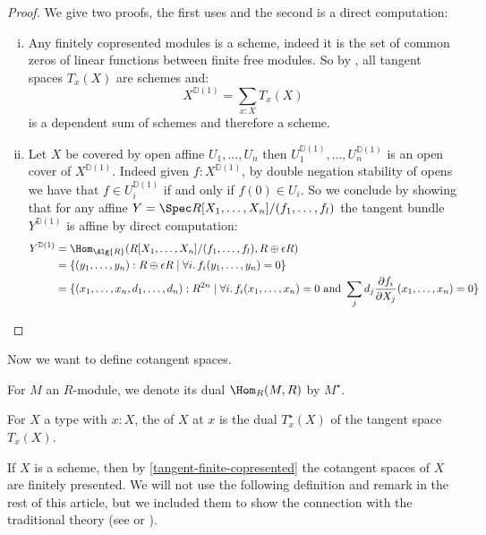 \begin{proof}
  We give two proofs, the first uses  and the second is a direct computation:
  \begin{enumerate}[(i)]
  \item Any finitely copresented modules is a scheme, indeed it is the set of common zeros of linear functions between finite free modules.
    So by , all tangent spaces $T_x(X)$ are schemes and:
    \[
      X^{\mathbb{D}(1)}=\sum_{x:X}T_x(X)
    \]
    is a dependent sum of schemes and therefore a scheme.
  \item Let $X$ be covered by open affine $U_1,\dots,U_n$ then $U_1^{\mathbb{D}(1)},\dots,U_n^{\mathbb{D}(1)}$ is an open cover of $X^{\mathbb{D}(1)}$. Indeed given $f:X^{\mathbb{D}(1)}$, by double negation stability of opens we have that $f\in U_i^{\mathbb{D}(1)}$ if and only if $f(0)\in U_i$.
    So we conclude by showing that for any affine $Y=\Spec R[X_1,\dots,X_n]/(f_1,\dots,f_l)$ the tangent bundle $Y^{\mathbb{D}(1)}$ is affine
    by direct computation:
    \begin{align*}
      Y^{\mathbb{D}(1)}&=\Hom_{\Alg{R}}(R[X_1,\dots,X_n]/(f_1,\dots,f_l), R\oplus \epsilon R) \\
                       &= \{(y_1,\dots,y_n):R\oplus \epsilon R \mid \forall i.\, f_i(y_1,\dots,y_n)=0\} \\
                       &= \{(x_1,\dots,x_n,d_1,\dots,d_n):R^{2n} \mid \forall i.\, f_i(x_1,\dots,x_n)=0\text{ and } \sum_j d_j\frac{\partial f_i}{\partial X_j}(x_1,\dots,x_n) =0\} 
    \end{align*}
  \end{enumerate}
\end{proof}

Now we want to define cotangent spaces.

\begin{definition}
  For $M$ an $R$-module, we denote its dual $\Hom_{R}(M,R)$ by $M^\star$.
\end{definition}

\begin{definition}
For $X$ a type with $x : X$, the  of $X$ at $x$ is the dual $T_x^\star(X)$ of the tangent space $T_x(X)$.
\end{definition}

If $X$ is a scheme, then by \cref{tangent-finite-copresented} the cotangent spaces of $X$ are finitely presented.
We will not use the following definition and remark in the rest of this article, but we included them to show the connection with the traditional theory (see \cite[p. 172]{Hartshorne} or \cite[p. 573]{vakil}).

